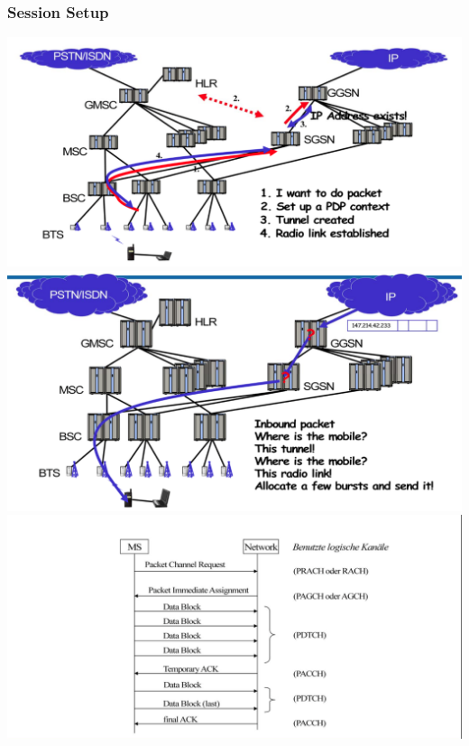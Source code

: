\subsubsection{Session Setup}

\begin{minipage}{0.5 \linewidth}
\includegraphics[width = \linewidth]{./Pics/SessionSetup} \\

\includegraphics[width = \linewidth]{./Pics/Packetdownlink} \\

\includegraphics[width = \linewidth]{./Pics/MSDatenverkehr} \\


\end{minipage}

